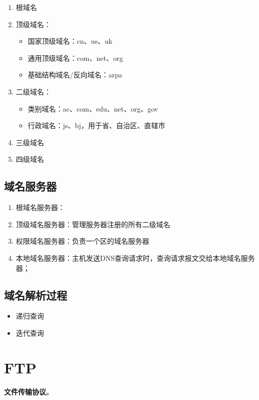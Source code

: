 \begin{enumerate}
    \item 根域名
    \item 顶级域名：\begin{itemize}
        \item 国家顶级域名：cn、us、uk
        \item 通用顶级域名：com、net、org
        \item 基础结构域名/反向域名：arpa
    \end{itemize}
    \item 二级域名：\begin{itemize}
        \item 类别域名：ac、com、edu、net、org、gov
        \item 行政域名：js、bj，用于省、自治区、直辖市
    \end{itemize}
    \item 三级域名
    \item 四级域名
\end{enumerate}


\subsection{域名服务器}
\begin{enumerate}
    \item 根域名服务器：
    \item 顶级域名服务器：管理服务器注册的所有二级域名
    \item 权限域名服务器：负责一个区的域名服务器
    \item 本地域名服务器：主机发送DNS查询请求时，查询请求报文交给本地域名服务器；
\end{enumerate}


\subsection{域名解析过程}

\begin{itemize}
    \item 递归查询
    \item 迭代查询
\end{itemize}


\section{FTP}
\textbf{文件传输协议}。



